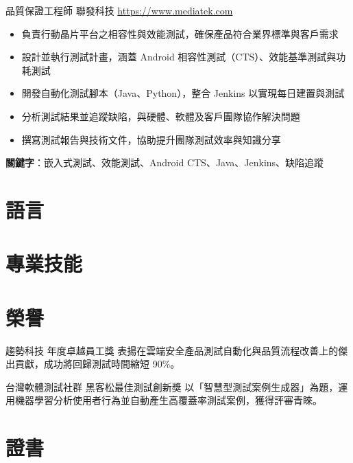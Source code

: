 \documentclass[a4paper, serif, 10pt]{moderncv}
\begin{document}
        {品質保證工程師}
        {聯發科技}
        {\url{https://www.mediatek.com}}
        {}
        {\begin{itemize}
\item 負責行動晶片平台之相容性與效能測試，確保產品符合業界標準與客戶需求
\item 設計並執行測試計畫，涵蓋 Android 相容性測試（CTS）、效能基準測試與功耗測試
\item 開發自動化測試腳本（Java、Python），整合 Jenkins 以實現每日建置與測試
\item 分析測試結果並追蹤缺陷，與硬體、軟體及客戶團隊協作解決問題
\item 撰寫測試報告與技術文件，協助提升團隊測試效率與知識分享
\end{itemize}
\textbf{關鍵字}：嵌入式測試、效能測試、Android CTS、Java、Jenkins、缺陷追蹤}
\section{語言}

\section{專業技能}

\section{榮譽}

        {趨勢科技}
        {年度卓越員工獎}
        {}
        {}
        {表揚在雲端安全產品測試自動化與品質流程改善上的傑出貢獻，成功將回歸測試時間縮短 90\%。}

        {台灣軟體測試社群}
        {黑客松最佳測試創新獎}
        {}
        {}
        {以「智慧型測試案例生成器」為題，運用機器學習分析使用者行為並自動產生高覆蓋率測試案例，獲得評審青睞。}
\section{證書}
\end{document}

